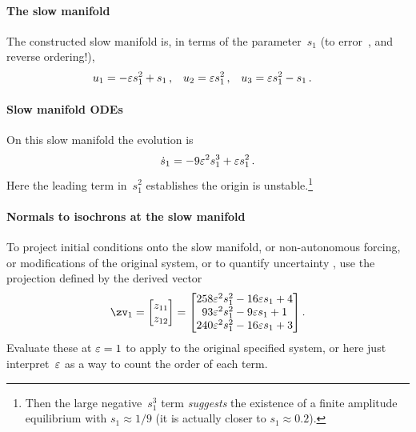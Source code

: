 \paragraph{The slow manifold} 
The constructed slow manifold is, in terms of the parameter~\(s_1\) (to error~, and reverse ordering!), 
\begin{align*}&
u_{1}=-\varepsilon s_{1}^{2}+s_{1}\,, &&
u_{2}=\varepsilon s_{1}^{2}\,, &&
u_{3}=\varepsilon s_{1}^{2}-s_{1}\,.
\end{align*}

\paragraph{Slow manifold ODEs} 
On this slow manifold the evolution is
\begin{equation*}
\dot s_{1}=-9 \varepsilon^{2} s_{1}^{3}+\varepsilon s_{1}^{2}\,.
\end{equation*}
Here the leading term in~\(s_1^2\) establishes the origin is unstable.\footnote{Then the large negative~\(s_1^3\) term \emph{suggests} the existence of a finite amplitude equilibrium with \(s_1\approx1/9\) (it is actually closer to \(s_1\approx 0.2\)).}


\paragraph{Normals to isochrons at the slow manifold}
To project initial conditions
onto the slow manifold, or non-autonomous
forcing, or modifications of the original system, or to quantify uncertainty \cite[]{Roberts89b, Roberts97b}, use the projection defined by the derived vector
\begin{equation*}
\zv_1=\begin{bmatrix}z_{11}\\z_{12}\end{bmatrix}
=\begin{bmatrix}
258 \eps^{2} s_{1}^{2}-16 \eps s_{1}+4
\\
93 \eps^{2} s_{1}^{2}-9 \eps s_{1}+1
\\
240 \eps^{2} s_{1}^{2}-16 \eps s_{1}+3
\end{bmatrix}.
\end{equation*}
Evaluate these at \(\varepsilon=1\) to apply to the original specified system, or here just interpret~\(\varepsilon\) as a way to count the order of each term.



